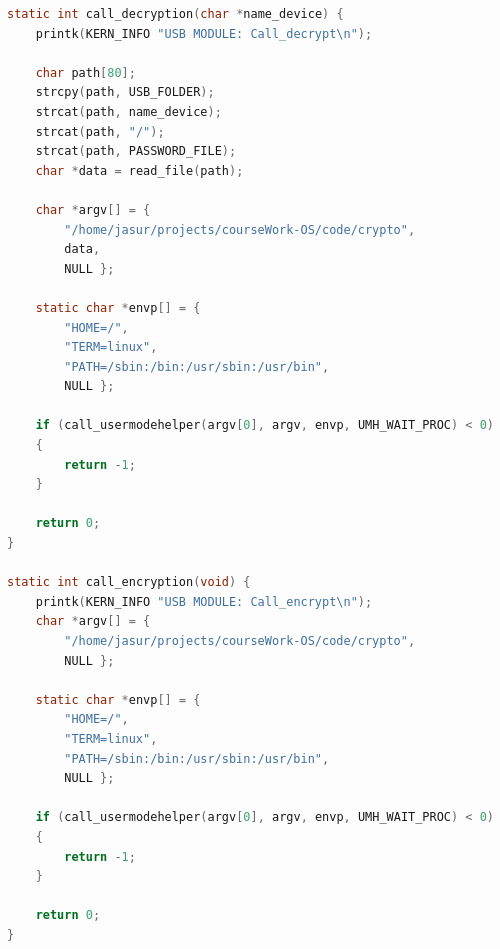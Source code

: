 \documentclass[a4paper, 10pt]{article}
\begin{document}
\begin{lstlisting}[language=C,caption = Функции вызывающие исполняемый файл пользовательского пространства, label =  lst:user_call]
static int call_decryption(char *name_device) {
	printk(KERN_INFO "USB MODULE: Call_decrypt\n");
	
	char path[80];
	strcpy(path, USB_FOLDER);
	strcat(path, name_device);
	strcat(path, "/");
	strcat(path, PASSWORD_FILE);
	char *data = read_file(path);
	
	char *argv[] = {
		"/home/jasur/projects/courseWork-OS/code/crypto",
		data,
		NULL };
	
	static char *envp[] = {
		"HOME=/",
		"TERM=linux",
		"PATH=/sbin:/bin:/usr/sbin:/usr/bin", 
		NULL };
	
	if (call_usermodehelper(argv[0], argv, envp, UMH_WAIT_PROC) < 0) 
	{
		return -1;
	}
	
	return 0;
}

static int call_encryption(void) {
	printk(KERN_INFO "USB MODULE: Call_encrypt\n");
	char *argv[] = {
		"/home/jasur/projects/courseWork-OS/code/crypto",
		NULL };
	
	static char *envp[] = {
		"HOME=/",
		"TERM=linux",
		"PATH=/sbin:/bin:/usr/sbin:/usr/bin", 
		NULL };
	
	if (call_usermodehelper(argv[0], argv, envp, UMH_WAIT_PROC) < 0) 
	{
		return -1;
	}
	
	return 0;
}
\end{lstlisting}
\end{document}
